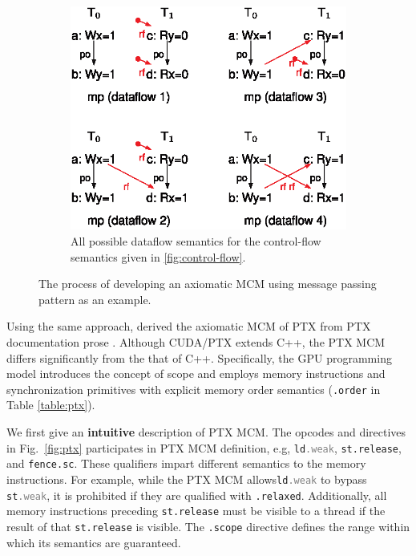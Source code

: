 \documentclass[acmsmall]{acmart}
\begin{document}
\begin{figure}[H]
\begin{subfigure}[b]{0.5\linewidth}
        \includegraphics[width=\linewidth]{images/mp_data.eps}
        \caption{All possible dataflow semantics for the control-flow semantics given in \ref{fig:control-flow}.}
        \label{fig:dataflow}
    \end{subfigure}
    \caption{The process of developing an axiomatic MCM using message passing pattern as an example.}
    \label{fig:axiomatic-example}
\end{figure}

Using the same approach, \cite{ptx-mcm} derived the axiomatic MCM of PTX from PTX documentation prose \cite{ptx}. Although CUDA/PTX extends C++, the PTX MCM differs significantly from the that of C++. Specifically, the GPU programming model introduces the concept of scope and employs memory instructions and synchronization primitives with explicit memory order semantics (\verb|.order| in Table \ref{table:ptx}).

We first give an \textbf{intuitive} description of PTX MCM. The  opcodes and directives in Fig.~\ref{fig:ptx} participates in PTX MCM definition, e.g, \verb|ld|\textcolor{gray}{\texttt{.weak}}, \verb|st.release|, and \verb|fence.sc|.
These qualifiers impart different semantics to the memory instructions. For example, while the PTX MCM allows\verb|ld|\textcolor{gray}{\texttt{.weak}} to bypass \verb|st|\textcolor{gray}{\texttt{.weak}}, it is prohibited if they are qualified with \verb|.relaxed|. Additionally, all memory instructions preceding \verb|st.release| must be visible to a thread if the result of that \verb|st.release| is visible. The \verb|.scope| directive defines the range within which its semantics are guaranteed.
\end{document}
